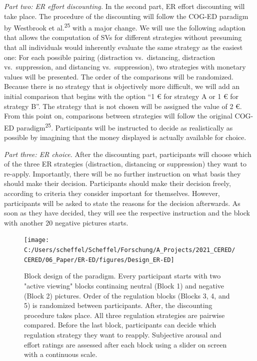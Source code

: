 \documentclass[
  english,
  man,floatsintext]{apa6}
\begin{document}
\emph{Part two: ER effort discounting.} In the second part, ER effort discounting will take place.
The procedure of the discounting will follow the COG-ED paradigm by Westbrook et al.\textsuperscript{25} with a major change.
We will use the following adaption that allows the computation of SVs for different strategies without presuming that all individuals would inherently evaluate the same strategy as the easiest one: For each possible pairing (distraction vs.~distancing, distraction vs.~suppression, and distancing vs.~suppression), two strategies with monetary values will be presented.
The order of the comparisons will be randomized.
Because there is no strategy that is objectively more difficult, we will add an initial comparison that begins with the option ``1 € for strategy A or 1 € for strategy B''.
The strategy that is not chosen will be assigned the value of 2 €.
From this point on, comparisons between strategies will follow the original COG-ED paradigm\textsuperscript{25}.
Participants will be instructed to decide as realistically as possible by imagining that the money displayed is actually available for choice.

\emph{Part three: ER choice.} After the discounting part, participants will choose which of the three ER strategies (distraction, distancing or suppression) they want to re-apply.
Importantly, there will be no further instruction on what basis they should make their decision.
Participants should make their decision freely, according to criteria they consider important for themselves.
However, participants will be asked to state the reasons for the decision afterwards.
As soon as they have decided, they will see the respective instruction and the block with another 20 negative pictures starts.

\begin{figure}
\texttt{[image: C:/Users/scheffel/Scheffel/Forschung/A\_Projects/2021\_CERED/CERED/06\_Paper/ER-ED/figures/Design\_ER-ED]} \caption{Block design of the paradigm. Every participant starts with two "active viewing" blocks continaing neutral (Block 1) and negative (Block 2) pictures. Order of the regulation blocks (Blocks 3, 4, and 5) is randomized between participants. After, the discounting procedure takes place. All three regulation strategies are pairwise compared. Before the last block, participants can decide which regulation strategy they want to reapply. Subjective arousal and effort ratings are assessed after each block using a slider on screen with a continuous scale.}\label{fig:DesignERED}
\end{figure}
\end{document}
